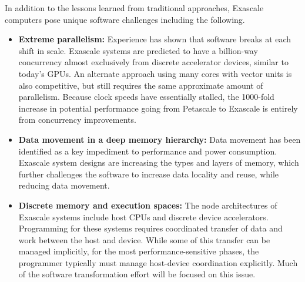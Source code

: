 In addition to the lessons learned from traditional approaches, Exascale computers pose unique software challenges including the following.
\begin{itemize}
\item \textbf{Extreme parallelism:} Experience has shown that software breaks at each shift in scale. Exascale systems are predicted to have a billion-way concurrency almost exclusively from discrete accelerator devices, similar to today's GPUs. An alternate approach using many cores with vector units is also competitive, but still requires the same approximate amount of parallelism.  Because clock speeds have essentially stalled, the 1000-fold increase in potential performance going from Petascale to Exascale is entirely from concurrency improvements.
\item \textbf{Data movement in a deep memory hierarchy: }Data movement has been identified as a key impediment to performance and power consumption. Exascale system designs are increasing the types and layers of memory, which further challenges the software to increase data locality and reuse, while reducing data movement.
\item \textbf{Discrete memory and execution spaces:} The node architectures of Exascale systems include host CPUs and discrete device accelerators.  Programming for these systems requires coordinated transfer of data and work between the host and device. While some of this transfer can be managed implicitly, for the most performance-sensitive phases, the programmer typically must manage host-device coordination explicitly.  Much of the software transformation effort will be focused on this issue.
\end{itemize}
 

